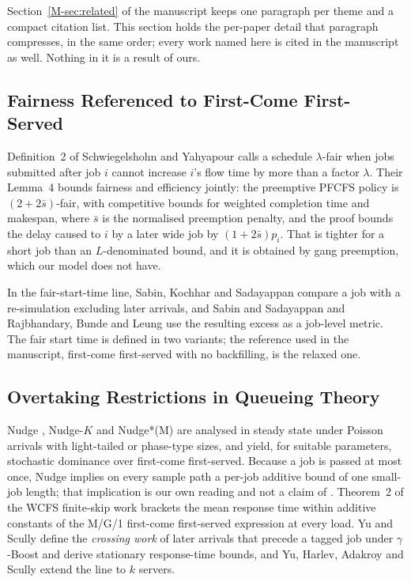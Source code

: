 \documentclass[mathematics,supfile,submit,moreauthors]{Definitions/mdpi}
\begin{document}
Section~\ref*{M-sec:related} of the manuscript keeps one paragraph per theme and a compact citation list.
This section holds the per-paper detail that paragraph compresses, in the same order;
every work named here is cited in the manuscript as well. Nothing in it is a result of
ours.

\subsection{Fairness Referenced to First-Come First-Served}

Definition~2 of Schwiegelshohn and Yahyapour \cite{schwiegelshohn2000fairness} calls a
schedule $\lambda$-fair when jobs submitted after job $i$ cannot increase $i$'s flow
time by more than a factor $\lambda$. Their Lemma~4 bounds fairness and efficiency
jointly: the preemptive PFCFS policy is $(2+2\bar s)$-fair, with competitive bounds for
weighted completion time and makespan, where $\bar s$ is the normalised preemption
penalty, and the proof bounds the delay caused to $i$ by a later wide job by
$(1+2\bar s)p_i$. That is tighter for a short job than an $L$-denominated bound, and it
is obtained by gang preemption, which our model does not have.

In the fair-start-time line, Sabin, Kochhar and Sadayappan \cite{sabin2004fairness}
compare a job with a re-simulation excluding later arrivals, and Sabin and Sadayappan
\cite{sabin2005unfairness} and Rajbhandary, Bunde and Leung \cite{rajbhandary2013fairness}
use the resulting excess as a job-level metric. The fair start time is defined in two
variants; the reference used in the manuscript, first-come first-served with no
backfilling, is the relaxed one.

\subsection{Overtaking Restrictions in Queueing Theory}

Nudge \cite{grosof2021nudge}, Nudge-$K$ \cite{vanhoudt2022nudgek} and Nudge*(M)
\cite{charlet2026nudgestarm} are analysed in steady state under Poisson arrivals with
light-tailed or phase-type sizes, and yield, for suitable parameters, stochastic
dominance over first-come first-served. Because a job is passed at most once, Nudge
implies on every sample path a per-job additive bound of one small-job length; that
implication is our own reading and not a claim of \cite{grosof2021nudge}. Theorem~2 of
the WCFS finite-skip work \cite{grosof2022wcfs} brackets the mean response time within
additive constants of the M/G/1 first-come first-served expression at every load. Yu and
Scully \cite{yu2024boost} define the \emph{crossing work} of later arrivals that precede
a tagged job under $\gamma$-Boost and derive stationary response-time bounds, and Yu,
Harlev, Adakroy and Scully \cite{yu2025twotraffics} extend the line to $k$ servers.
\end{document}
